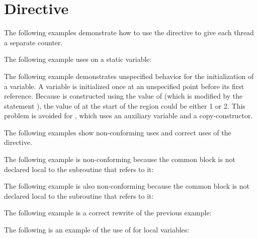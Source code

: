 \section{ Directive}
\label{sec:threadprivate}

The following examples demonstrate how to use the  directive 
 to give each thread a separate counter.



\pagebreak
\ccppspecificstart
The following example uses  on a static variable:


The following example demonstrates unspecified behavior for the initialization 
of a  variable. A   variable is initialized 
once at an unspecified point before its first reference. Because  is 
constructed using the value of   (which is modified by the statement 
), the value of   at the start of the  
region could be either 1 or 2. This problem is avoided for , which uses 
an auxiliary  variable and a copy-constructor.

\ccppspecificend

The following examples show non-conforming uses and correct uses of the  
directive. 

\fortranspecificstart
The following example is non-conforming because the common block is not declared 
local to the subroutine that refers to it:


The following example is also non-conforming because the common block is not declared 
local to the subroutine that refers to it:


The following example is a correct rewrite of the previous example:


The following is an example of the use of  for local variables:


